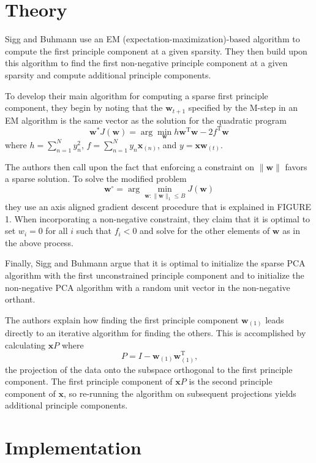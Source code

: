 \documentclass[twocolumn]{article}
\begin{document}
\section{Theory}

Sigg and Buhmann use an EM (expectation-maximization)-based algorithm
to compute the first principle component at a given sparsity.
They then build upon this algorithm to find the first non-negative
principle component at a given sparsity and compute additional
principle components.

To develop their main algorithm for computing a sparse first principle
component, they begin by noting that the $\mathbf{w}_{t+1}$
specified by the M-step in an EM algorithm is the same vector as the
solution for the quadratic program
\[
\mathbf{w}^* J(\mathbf{w}) =
\arg\min_{\mathbf{w}} h \mathbf{w}^\mathrm{T} \mathbf{w} - 2 f^\mathrm{T} \mathbf{w}
\]
where $h = \sum_{n=1}^N y_n^2$, $f = \sum_{n=1}^N y_n \mathbf{x}_{(n)}$,
and $y = \mathbf{x} \mathbf{w}_{(t)}$.

The authors then call upon the fact that enforcing a constraint
on $\|\mathbf{w}\|$ favors a sparse solution.
To solve the modified problem
\[
\mathbf{w}^\circ = \arg\min_{
  \mathbf
{w} : \|\mathbf
{w}\|_1 \le B
} J(\mathbf{w})
\]
they use an axis aligned gradient descent procedure
that is explained in FIGURE 1.
When incorporating a non-negative constraint, they claim that it is
optimal to set $w_i = 0$ for all $i$ such that $f_i < 0$
and solve for the other elements of $\mathbf{w}$ as in the above process.

Finally, Sigg and Buhmann argue that it is optimal to initialize
the sparse PCA algorithm with the first unconstrained principle component
and to initialize the non-negative PCA algorithm with a random unit vector
in the non-negative orthant.

The authors explain how finding the first principle component
$\mathbf{w}_{(1)}$ leads directly to an iterative algorithm
for finding the others.
This is accomplished by calculating $\mathbf{x} P$
where \[ P = I - \mathbf{w}_{(1)} \mathbf{w}_{(1)}^\mathrm{T} \textrm{,} \]
the projection of the data onto the subspace orthogonal to the
first principle component.
The first principle component of $\mathbf{x} P$ is the second
principle component of $\mathbf{x}$, so re-running the algorithm
on subsequent projections yields additional principle components.

\section{Implementation}
\end{document}
